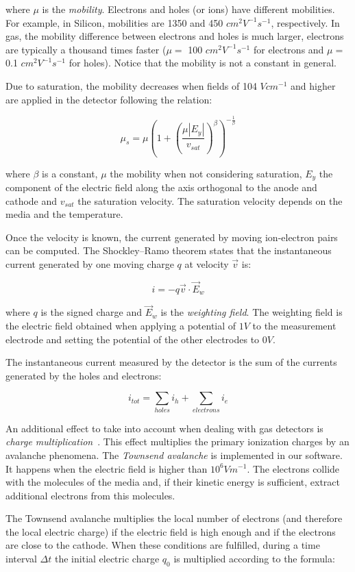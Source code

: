 \documentclass[11pt]{article}
\begin{document}
where $\mu$ is the \textit{mobility}. Electrons and holes (or ions) have different
mobilities. For example, in Silicon, mobilities are 1350 and 450 $cm^2V^{-1}s^{-1}$,
respectively. In gas, the mobility difference between electrons and holes is
much larger, electrons are typically a thousand times faster ($\mu =$ 100 $cm^2V^{-1}s^{-1}$
for electrons and $\mu =$ 0.1 $cm^2V^{-1}s^{-1}$ for holes). Notice that the mobility
is not a constant in general.

Due to saturation, the mobility decreases when fields of 104 $V cm^{-1}$ and higher are applied in
the detector following the relation:

\[\mu_s = \mu \left (1 + \left (\frac{\mu |E_y|}{v_{sat}} \right )^{\beta} \right )^{-\frac{1}{\beta}}\]

where $\beta$ is a constant, $\mu$ the mobility when not considering saturation,
$E_y$ the component of the electric field along the axis orthogonal to the anode and cathode
and $v_{sat}$ the saturation velocity. The saturation velocity depends on the
media and the temperature.

Once the velocity is known, the current generated by moving ion-electron
pairs can be computed. The Shockley–Ramo theorem states that the instantaneous current generated
by one moving charge $q$ at velocity $\vec{v}$ is:

\[i = -q \vec{v} \cdot \vec{E}_w\]

where $q$ is the signed charge and $\vec{E}_w$ is the \textit{weighting field}. The weighting field is the electric field
obtained when applying a potential of $1V$ to the measurement electrode and setting
the potential of the other electrodes to $0V$.

The instantaneous current measured
by the detector is the sum of the currents generated by the holes and electrons:

\[i_{tot} = \sum_{holes} i_h + \sum_{electrons} i_e\]

An additional effect to take into account  when dealing with gas detectors is
\textit{charge multiplication}~\cite{lphy2236}. This effect
multiplies the primary ionization charges by an avalanche phenomena.
The \textit{Townsend avalanche} is implemented in our software. It happens
when the electric field is higher than $10^6Vm^{-1}$. The electrons collide
with the molecules of the media and, if their kinetic energy is sufficient,
extract additional electrons from this molecules.

The Townsend avalanche multiplies the local number of electrons (and therefore the local electric
charge) if the electric field is high enough and if the electrons are close
to the cathode. When these conditions are fulfilled, during a time interval
$\Delta t$ the initial electric charge $q_0$ is multiplied
according to the formula:
\end{document}
